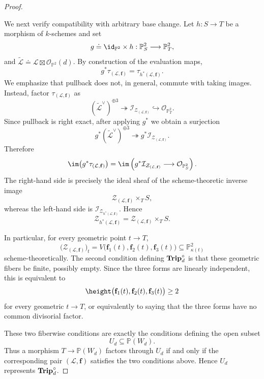 \documentclass[11pt]{amsart} %
\newcommand{\lar}{\longrightarrow}
\theoremstyle{definition}
\def\NZQ{\mathbb}               %
\def\PP{{\NZQ P}}
\def\Trip{{\bf Trip}}
\begin{document}
\begin{proof}
\begin{itemize}
We next verify compatibility with arbitrary base change. Let
$h:S\lar T$ be a morphism of $k$-schemes and set
\[
g\doteq\id_{\PP^2}\times h:
\PP^2_S\longrightarrow\PP^2_T,
\]
and \(\widetilde{\mathcal L}
\doteq
\mathcal L\boxtimes\mathcal O_{\PP^2}(d)\). By construction of the evaluation maps,
\[
g^*\tau_{(\mathcal L,\mathbf f)}
=
\tau_{h^*(\mathcal L,\mathbf f)}.
\]
We emphasize that pullback does not, in general, commute with taking
images. Instead, factor $\tau_{(\mathcal L,\mathbf f)}$ as
\[
(\widetilde{\mathcal L}^{\vee})^{\oplus3}
\twoheadrightarrow
\mathcal I_{\mathcal Z_{(\mathcal L,\mathbf f)}}
\hookrightarrow
\mathcal O_{\PP^2_T}.
\]
Since pullback is right exact, after applying $g^*$ we obtain a
surjection
\[
g^*(\widetilde{\mathcal L}^{\vee})^{\oplus3}
\twoheadrightarrow
g^*\mathcal I_{\mathcal Z_{(\mathcal L,\mathbf f)}}.
\]
Therefore
\[
\im\bigl(g^*\tau_{(\mathcal L,\mathbf f)}\bigr)
=
\im\left(
g^*\mathcal I_{\mathcal Z_{(\mathcal L,\mathbf f)}}
\longrightarrow
\mathcal O_{\PP^2_S}
\right).
\]
The right-hand side is precisely the ideal sheaf of the
scheme-theoretic inverse image
\[
\mathcal Z_{(\mathcal L,\mathbf f)}\times_T S,
\]
whereas the left-hand side is \(
\mathcal I_{\mathcal Z_{h^*(\mathcal L,\mathbf f)}}\). Hence
\begin{equation}\label{eq:pullback-Z-scheme}
\mathcal Z_{h^*(\mathcal L,\mathbf f)}
=
\mathcal Z_{(\mathcal L,\mathbf f)}\times_T S.
\end{equation}

In particular, for every geometric point $t\lar T$,
\[
\bigl(\mathcal Z_{(\mathcal L,\mathbf f)}\bigr)_t
=
V\bigl(
\mathbf f_1(t),\mathbf f_2(t),\mathbf f_3(t)
\bigr)
\subseteq\PP^2_{\kappa(t)}
\]
scheme-theoretically. The second condition defining $\Trip_d^\circ$ is that these geometric
fibers be finite, possibly empty. Since the three forms are linearly
independent, this is equivalent to
\[
\height\bigl(
\mathbf f_1(t),\mathbf f_2(t),\mathbf f_3(t)
\bigr)\geq2
\]
for every geometric $t\lar T$, or equivalently to saying that the
three forms have no common divisorial factor.
\end{itemize}

These two fiberwise conditions are exactly the conditions defining the open subset
\[
U_d\subseteq\PP(W_d).
\]
Thus a morphism $T\lar\PP(W_d)$ factors through $U_d$ if and only if
the corresponding pair $(\mathcal L,\mathbf f)$ satisfies the two
conditions above. Hence $U_d$ represents $\Trip_d^\circ$.


\end{proof}
\end{document}
